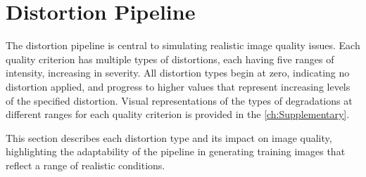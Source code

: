 \section{Distortion Pipeline}
\label{sec:DistPipeline}
The distortion pipeline is central to simulating realistic image quality issues. Each quality criterion has multiple types of distortions, each having five ranges of intensity, increasing in severity. All distortion types begin at zero, indicating no distortion applied, and progress to higher values that represent increasing levels of the specified distortion. Visual representations of the types of degradations at different ranges for each quality criterion is provided in the \autoref{ch:Supplementary}.  \par
\vspace{\baselineskip}
\noindent
This section describes each distortion type and its impact on image quality, highlighting the adaptability of the pipeline in generating training images that reflect a range of realistic conditions. \par

